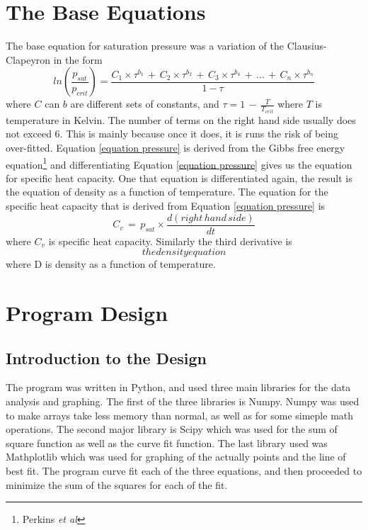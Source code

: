 \documentclass{article}
\begin{document}
\begin{singlespacing}
\section*{The Base Equations}
The base equation for saturation pressure was a variation of  the Clausius-Clapeyron in the form
\begin{equation}
 ln(\frac{p_{sat}}{p_{crit}}) = \frac{C_{1} \times \tau^{b_1} \,+\, C_{2}\times \tau^{b_2} \, + \, C_{3}\times \tau^{b_4} \, + \, ... \, + \, C_{n} \times \tau^{b_n}}{1-\tau}
\label{equation pressure}
 \end{equation}
where $C$ can $b$ are different sets of constants, and $\tau = 1\, - \, \frac{T}{T_{crit}}$ where $T$ is temperature in Kelvin. The number of terms on the right hand side usually does not exceed 6. This is mainly because once it does, it is runs the risk of being over-fitted. Equation \ref{equation pressure} is derived from the Gibbs free energy equation\footnote{Perkins \textit{et al}} and differentiating Equation \ref{equation pressure} gives us the equation for specific heat capacity. One that equation is differentiated again, the result is the equation of density as a function of temperature. The equation for the specific heat capacity that is derived from Equation \ref{equation pressure} is 
\begin{equation}
C_{v}\, = \, p_{sat} \times \frac{d(right\, hand\, side)}{dt}
\label{specific heat}
\end{equation}
where $C_{v}$ is specific heat capacity. Similarly the third derivative is
\begin{equation}
the density equation
\label{desity equation}
\end{equation}
where D is density as a function of temperature.
\section*{Program Design}
\subsection*{Introduction to the Design}
\indent The program was written in Python, and used three main libraries for the data analysis and graphing. The first of the three libraries is Numpy. Numpy was used to make arrays take less memory than normal, as well as for some simeple math operations. The second major library is Scipy which was used for the sum of square function as well as the curve fit function. The last library used was Mathplotlib which was used for graphing of the actually points and the line of best fit. The program curve fit each of the three equations, and then proceeded to minimize the sum of the squares for each of the fit.

\end{singlespacing}
\end{document}
